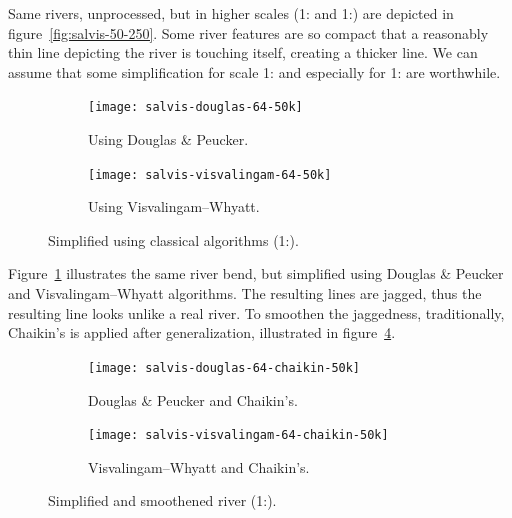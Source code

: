 \documentclass[a4paper]{article}
\newcommand{\DP}{Douglas \& Peucker}
\newcommand{\VW}{Visvalingam--Whyatt}
\begin{document}
Same rivers, unprocessed, but in higher scales (1: and
1:) are depicted in figure~\ref{fig:salvis-50-250}. Some
river features are so compact that a reasonably thin line depicting the river
is touching itself, creating a thicker line. We can assume that some
simplification for scale 1: and especially for
1: are worthwhile.

\begin{figure}[ht]
    \centering
    \begin{subfigure}[b]{.49\textwidth}
        \texttt{[image: salvis-douglas-64-50k]}
        \caption{Using {\DP}.}
    \end{subfigure}
    \hfill
    \begin{subfigure}[b]{.49\textwidth}
        \texttt{[image: salvis-visvalingam-64-50k]}
        \caption{Using {\VW}.}
    \end{subfigure}
    \caption{Simplified using classical algorithms (1:).}
    \label{fig:salvis-generalized-50k}
\end{figure}

Figure~\ref{fig:salvis-generalized-50k} illustrates the same river bend, but
simplified using {\DP} and {\VW} algorithms. The resulting lines are jagged,
thus the resulting line looks unlike a real river. To smoothen the jaggedness,
traditionally, Chaikin's\cite{chaikin1974algorithm} is applied after
generalization, illustrated in figure~\ref{fig:salvis-generalized-chaikin-50k}.

\begin{figure}[ht!]
    \centering
    \begin{subfigure}[b]{.49\textwidth}
        \texttt{[image: salvis-douglas-64-chaikin-50k]}
        \caption{{\DP} and Chaikin's.}
        \label{fig:salvis-douglas-64-chaikin-50k}
    \end{subfigure}
    \hfill
    \begin{subfigure}[b]{.49\textwidth}
        \texttt{[image: salvis-visvalingam-64-chaikin-50k]}
        \caption{{\VW} and Chaikin's.}
        \label{fig:salvis-visvalingam-64-chaikin-50k}
    \end{subfigure}
    \caption{Simplified and smoothened river (1:).}
    \label{fig:salvis-generalized-chaikin-50k}
\end{figure}
\end{document}
